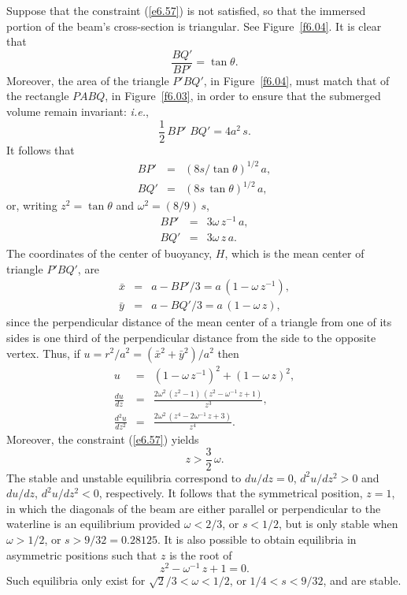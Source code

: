 Suppose that the constraint (\ref{e6.57}) is not satisfied, so that the immersed portion of the beam's cross-section
is triangular. See Figure~\ref{f6.04}. It is clear that
\begin{equation}
\frac{BQ'}{BP'} = \tan\theta.
\end{equation}
Moreover, the area of the triangle $P'BQ'$, in Figure~\ref{f6.04}, must match that of the rectangle $PABQ$, in
Figure~\ref{f6.03}, in order to ensure that the submerged volume remain invariant: {\em i.e.},
\begin{equation}
\frac{1}{2}\,BP'\,\,BQ'= 4a^2\,s.
\end{equation}
It follows that
\begin{eqnarray}
BP' &=& (8s/\tan\theta)^{1/2}\,a,\\[0.5ex]
BQ' &=& (8s\,\tan\theta)^{1/2}\,a,
\end{eqnarray}
or, writing $z^2=\tan\theta$ and $\omega^2 = (8/9)\,s$, 
\begin{eqnarray}
BP' &=& 3\omega\,z^{-1}\,a,\\[0.5ex]
BQ'&=& 3\omega\,z\,a.
\end{eqnarray}
The coordinates of the center of buoyancy, $H$, which is the mean center of triangle $P'BQ'$, are
\begin{eqnarray}
\bar{x} &=& a- BP'/3= a\,(1-\omega\,z^{-1}),\\[0.5ex]
\bar{y} &=& a-BQ'/3=a\,(1-\omega\,z),
\end{eqnarray}
since the perpendicular distance of the mean center of a triangle from one of its sides is one third of the perpendicular distance
from the side to the opposite vertex.
Thus, if $u=r^2/a^2=(\bar{x}^2+ \bar{y}^2)/a^2$ then
\begin{eqnarray}
u &=&(1-\omega\,z^{-1})^2 + (1-\omega\,z)^2,\\[0.5ex]
\frac{du}{dz} &=& \frac{2\omega^2\,(z^2-1)\,(z^2-\omega^{-1}\,z+1)}{z^3},\\[0.5ex]
\frac{d^2u}{dz^2} &=& \frac{2\omega^2\,(z^4-2\omega^{-1}\,z+3)}{z^4}.
\end{eqnarray}
Moreover, the constraint (\ref{e6.57}) yields
\begin{equation}
z > \frac{3}{2}\,\omega.
\end{equation}
The stable and unstable equilibria correspond to $du/dz=0$, $d^2u/dz^2>0$ and $du/dz$, $d^2u/dz^2<0$, respectively. 
It follows that the symmetrical position, $z=1$, in which the diagonals of the beam are either parallel or perpendicular to the
waterline is an equilibrium provided $\omega<2/3$, or $s<1/2$,  but is only stable when
$\omega>1/2$, or $s>9/32=0.28125$. 
It is also possible to obtain equilibria in asymmetric positions such that $z$ is the root of
\begin{equation}
z^2-\omega^{-1}\,z+1=0.
\end{equation}
Such equilibria only exist for $\sqrt{2}/3<\omega<1/2$, or $1/4<s<9/32$, and are stable. 

